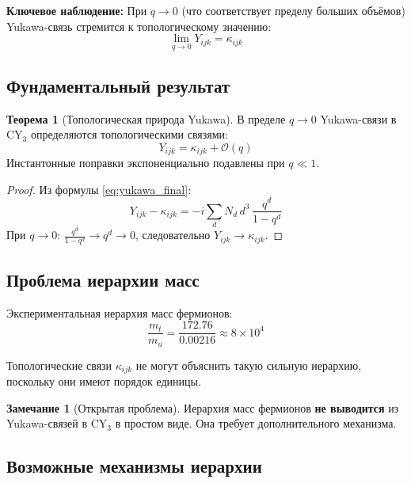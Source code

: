 \documentclass[12pt,a4paper,twoside]{article}
\theoremstyle{definition}
\newtheorem{theorem}{Теорема}[section]
\newtheorem{remark}{Замечание}[section]
\begin{document}
\textbf{Ключевое наблюдение:} При $q \to 0$ (что соответствует пределу больших объёмов) Yukawa-связь стремится к топологическому значению:
\begin{equation}
\boxed{
\lim_{q \to 0} Y_{ijk} = \kappa_{ijk}
}
\label{eq:yukawa_limit}
\end{equation}

\subsection{Фундаментальный результат}

\begin{theorem}[Топологическая природа Yukawa]
В пределе $q \to 0$ Yukawa-связи в CY$_3$ определяются топологическими связями:
\begin{equation}
Y_{ijk} = \kappa_{ijk} + \mathcal{O}(q)
\end{equation}
Инстантонные поправки экспоненциально подавлены при $q \ll 1$.
\end{theorem}

\begin{proof}
Из формулы \eqref{eq:yukawa_final}:
\begin{equation}
Y_{ijk} - \kappa_{ijk} = -i \sum_d N_d \, d^3 \, \frac{q^d}{1-q^d}
\end{equation}
При $q \to 0$: $\frac{q^d}{1-q^d} \to q^d \to 0$, следовательно $Y_{ijk} \to \kappa_{ijk}$.
\end{proof}

\subsection{Проблема иерархии масс}

Экспериментальная иерархия масс фермионов:
\begin{equation}
\frac{m_t}{m_u} = \frac{172.76}{0.00216} \approx 8 \times 10^4
\label{eq:hierarchy}
\end{equation}

Топологические связи $\kappa_{ijk}$ не могут объяснить такую сильную иерархию, поскольку они имеют порядок единицы.

\begin{remark}[Открытая проблема]
Иерархия масс фермионов \textbf{не выводится} из Yukawa-связей в CY$_3$ в простом виде. Она требует дополнительного механизма.
\end{remark}

\subsection{Возможные механизмы иерархии}
\end{document}
